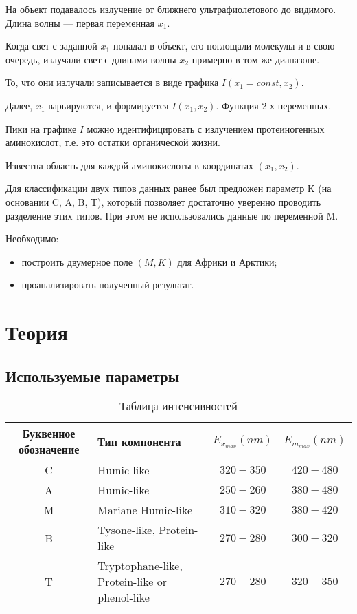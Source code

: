 \documentclass[12pt,a4paper]{article}
\begin{document}
		На объект подавалось излучение от ближнего ультрафиолетового до видимого. Длина волны — первая переменная $x_1$.
		
		Когда свет с заданной $x_1$ попадал в объект, его поглощали молекулы и в свою очередь, излучали свет с длинами волны $x_2$ примерно в том же диапазоне.
		
		То, что они излучали записывается в виде графика $I(x_1 = const, x_2)$.
		
		Далее, $x_1$ варьируются, и формируется $I(x_1, x_2
		)$. Функция 2-х переменных.
		
		Пики на графике $I$ можно идентифицировать с излучением протеиногенных аминокислот, т.е. это остатки органической жизни.
		
		Известна область для каждой аминокислоты в координатах $(x_1, x_2)$.
		
		\hfill
		
		Для классификации двух типов данных ранее был предложен параметр K (на основании C, A, B, T), который позволяет достаточно уверенно проводить разделение этих типов. При этом не использовались данные по переменной M.
		
		Необходимо:
		\begin{itemize}
			\item построить двумерное поле $(M, K)$ для Африки и Арктики;
			\item проанализировать полученный результат.
		\end{itemize}
	
	\section{Теория}
		\subsection {Используемые параметры}
		\begin{table}[H]
			\begin{center}
				\begin{tabular}{|c|p{100pt}|c|c|}
					\hline
					Буквенное обозначение & Тип компонента & $E_{x_{max}}(nm)$ & $E_{m_{max}}(nm)$ \\
					\hline
					C & Humic-like & $320-350$ & $420-480$ \\
					\hline
					A & Humic-like & $250-260$ & $380-480$ \\
					\hline
					M & Mariane
					Humic-like & $310-320$ & $380-420$ \\
					\hline
					B & Tysone-like,
					Protein-like & $270-280$ & $300-320$ \\
					\hline
					T & Tryptophane-like,
					Protein-like or
					phenol-like & $270-280$ & $320-350$ \\
					\hline
				\end{tabular}
				\caption{Таблица интенсивностей}
				\label{table:intensity}
			\end{center}
		\end{table}
		
\end{document}
